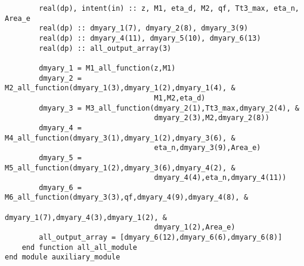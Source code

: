 \begin{verbatim}
        real(dp), intent(in) :: z, M1, eta_d, M2, qf, Tt3_max, eta_n, Area_e
        real(dp) :: dmyary_1(7), dmyary_2(8), dmyary_3(9)
        real(dp) :: dmyary_4(11), dmyary_5(10), dmyary_6(13)
        real(dp) :: all_output_array(3)

        dmyary_1 = M1_all_function(z,M1)
        dmyary_2 = M2_all_function(dmyary_1(3),dmyary_1(2),dmyary_1(4), &
                                   M1,M2,eta_d)
        dmyary_3 = M3_all_function(dmyary_2(1),Tt3_max,dmyary_2(4), &
                                   dmyary_2(3),M2,dmyary_2(8))
        dmyary_4 = M4_all_function(dmyary_3(1),dmyary_1(2),dmyary_3(6), &
                                   eta_n,dmyary_3(9),Area_e)
        dmyary_5 = M5_all_function(dmyary_1(2),dmyary_3(6),dmyary_4(2), &
                                   dmyary_4(4),eta_n,dmyary_4(11))
        dmyary_6 = M6_all_function(dmyary_3(3),qf,dmyary_4(9),dmyary_4(8), &
                                   dmyary_1(7),dmyary_4(3),dmyary_1(2), &
                                   dmyary_1(2),Area_e)
        all_output_array = [dmyary_6(12),dmyary_6(6),dmyary_6(8)]
    end function all_all_module
end module auxiliary_module
\end{verbatim}